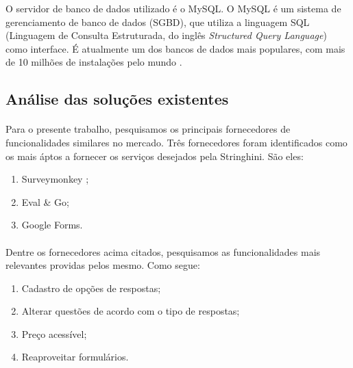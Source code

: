\documentclass[11pt]{article}
\begin{document}
          O servidor de banco de dados utilizado é o MySQL. 
          O MySQL é um sistema de gerenciamento de banco de dados (SGBD), 
          que utiliza a linguagem SQL (Linguagem de Consulta Estruturada, 
          do inglês {\em Structured Query Language}) como interface. 
          É atualmente um dos bancos de dados mais populares, 
          com mais de 10 milhões de instalações pelo mundo \cite{website:mysql}.
  
  \clearpage
  
      \subsection{Análise das soluções existentes}

      \paragraph{}

      Para o presente trabalho, pesquisamos os principais fornecedores de 
      funcionalidades similares no mercado. Três fornecedores foram 
      identificados como os mais áptos a fornecer os serviços desejados
      pela Stringhini. São eles:

      \begin{enumerate}
        \item Surveymonkey \cite{website:surveymonkey};
        \item Eval \& Go\cite{website:evalgo};
        \item Google Forms\cite{website:googleforms}.
      \end{enumerate}

      \paragraph{}
      
      Dentre os fornecedores acima citados, pesquisamos as 
      funcionalidades mais relevantes providas pelos mesmo. Como segue:

      \begin{enumerate}
        \item Cadastro de opções de respostas;
        \item Alterar questões de acordo com o tipo de respostas;
        \item Preço acessível;
        \item Reaproveitar formulários.
      \end{enumerate}
\end{document}
